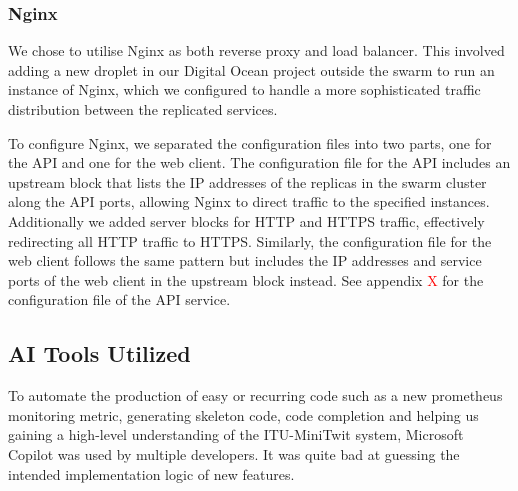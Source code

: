 \subsubsection*{Nginx}
We chose to utilise Nginx as both reverse proxy and load balancer. This involved adding a new droplet in our Digital Ocean project outside the swarm to run an instance of Nginx, which we configured to handle a more sophisticated traffic distribution between the replicated services.

To configure Nginx, we separated the configuration files into two parts, one for the API and one for the web client. The configuration file for the API includes an upstream block that lists the IP addresses of the replicas in the swarm cluster along the API ports, allowing Nginx to direct traffic to the specified instances. Additionally we added server blocks for HTTP and HTTPS traffic, effectively redirecting all HTTP traffic to HTTPS. Similarly, the configuration file for the web client follows the same pattern but includes the IP addresses and service ports of the web client in the upstream block instead. See appendix \textcolor{red}{X} for the configuration file of the API service.


\subsection{AI Tools Utilized}
To automate the production of easy or recurring code such as a new prometheus monitoring metric, generating skeleton code, code completion and helping us gaining a high-level understanding of the ITU-MiniTwit system, Microsoft Copilot was used by multiple developers. It was quite bad at guessing the intended implementation logic of new features.
